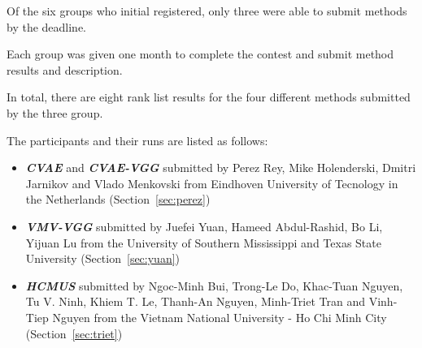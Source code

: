 \documentclass[../main.tex]{subfiles}
\begin{document}
Of the six groups who initial registered, only three were able to submit methods by the deadline.

Each group was given one month to complete the contest and  submit method results and description.

In total, there are eight rank list results for the four different methods submitted by the three group. 

The participants and their runs are listed as follows:

\begin{itemize}
	
	\item  \textbf{\textit{CVAE}} and \textbf{\textit{CVAE-VGG}} submitted by Perez Rey, Mike Holenderski, Dmitri Jarnikov and Vlado Menkovski from Eindhoven University of Tecnology in the Netherlands (Section~\ref{sec:perez})
	
	\item  \textbf{\textit{VMV-VGG}} submitted by Juefei Yuan, Hameed Abdul-Rashid, Bo Li, Yijuan Lu from the University of Southern Mississippi and Texas State University (Section~\ref{sec:yuan})
	
	\item  \textbf{\textit{HCMUS}} submitted by 
	Ngoc-Minh Bui, Trong-Le Do, Khac-Tuan Nguyen, Tu V. Ninh, Khiem T. Le, Thanh-An Nguyen, Minh-Triet Tran and Vinh-Tiep Nguyen from the Vietnam National University - Ho Chi Minh City (Section~\ref{sec:triet})

\end{itemize}
\end{document}

